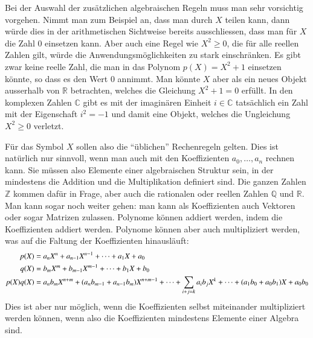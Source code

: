 Bei der Auswahl der zusätzlichen algebraischen Regeln muss man sehr
vorsichtig vorgehen.
Nimmt man zum Beispiel an, dass man durch $X$ teilen kann, dann würde
dies in der arithmetischen Sichtweise bereits ausschliessen, dass man
für $X$ die Zahl $0$ einsetzen kann.
Aber auch eine Regel wie $X^2 \ge 0$, die für alle reellen Zahlen gilt,
würde die Anwendungsmöglichkeiten zu stark einschränken.
Es gibt zwar keine reelle Zahl, die man in das Polynom $p(X)=X^2+1$
einsetzen könnte, so dass es den Wert $0$ annimmt.
Man könnte $X$ aber als ein neues Objekt ausserhalb von $\mathbb{R}$
betrachten, welches die Gleichung $X^2+1=0$ erfüllt.
In den komplexen Zahlen $\mathbb{C}$ gibt es mit der imaginären
Einheit $i\in\mathbb{C}$ tatsächlich ein Zahl mit der Eigenschaft
$i^2=-1$ und damit eine Objekt, welches die Ungleichung $X^2\ge 0$
verletzt.

Für das Symbol $X$ sollen also die ``üblichen'' Rechenregeln gelten.
Dies ist natürlich nur sinnvoll, wenn man auch mit den Koeffizienten
$a_0,\dots,a_n$ rechnen kann.
Sie müssen also Elemente einer
algebraischen Struktur sein, in der mindestens die Addition und die
Multiplikation definiert sind.
Die ganzen Zahlen $\mathbb{Z}$ kommen dafür in Frage, aber auch
die rationalen oder reellen Zahlen $\mathbb{Q}$ und $\mathbb{R}$.
Man kann sogar noch weiter gehen: man kann als Koeffizienten auch
Vektoren oder sogar Matrizen zulassen.
Polynome können addiert werden, indem die Koeffizienten addiert werden.
Polynome können aber auch multipliziert werden, was auf die Faltung
der Koeffizienten hinausläuft:
\begin{align}
p(X) &= a_nX^n + a_{n-1}X^{n-1} + \dots + a_1X + a_0
\notag
\\
q(X) &= b_mX^m + b_{m-1}X^{m-1} + \dots + b_1X + b_0
\notag
\\
p(X) q(X) &=
a_{n}b_{m}X^{n+m}
+
(a_{n}b_{m-1}+a_{n-1}b_{m})X^{n+m-1}
+
\dots
+
\sum_{i + j = k}a_ib_j X^k
+
\dots
+
(a_1b_0+a_0b_1)X
+
a_0b_0
\label{buch:eqn:polynome:faltung}
\end{align}
Dies ist aber nur möglich, wenn die Koeffizienten selbst miteinander
multipliziert werden können, wenn also die Koeffizienten mindestens
Elemente einer Algebra sind.



%
%


